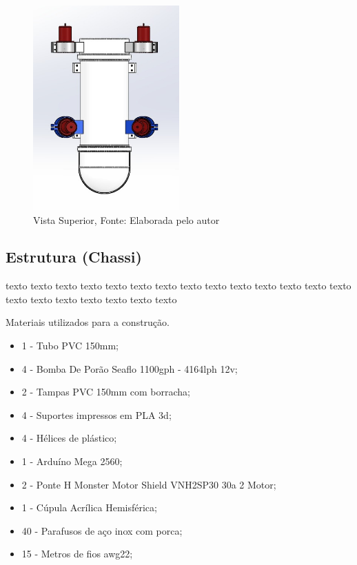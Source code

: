 \begin{figure}[!htb]
	\centering	
	\includegraphics[angle=90,width=0.5\textwidth]{Figures/Rov/Proj_vista_superior.jpeg}
	\caption{Vista Superior, Fonte: Elaborada pelo autor\the\year}
	\label{fig:Projvistasuperior}
\end{figure}


\subsection{Estrutura (Chassi)}
\label{sec:estruturachassi}

texto texto texto texto texto texto texto
texto texto texto texto texto texto texto
texto texto texto texto texto texto texto

Materiais utilizados para a construção.

\begin{itemize}
    \item 1 - Tubo PVC 150mm;
    \item 4 - Bomba De Porão Seaflo 1100gph - 4164lph 12v;
    \item 2 - Tampas PVC 150mm com borracha;
    \item 4 - Suportes impressos em PLA 3d;
    \item 4 - Hélices de plástico;
    \item 1 - Arduíno Mega 2560;
    \item 2 - Ponte H Monster Motor Shield VNH2SP30 30a 2 Motor;
    \item 1 - Cúpula Acrílica Hemisférica;
    \item 40 - Parafusos de aço inox com porca;
    \item 15 - Metros de fios awg22;
\end{itemize}

